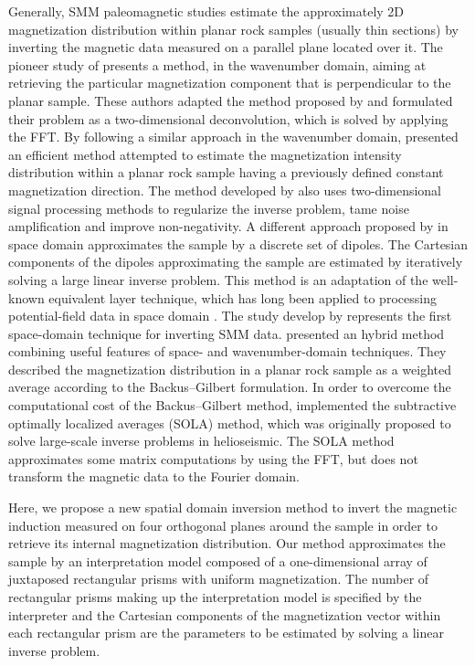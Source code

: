 \documentclass[draft,gc]{agutex}
\begin{document}
\begin{article}
Generally, SMM paleomagnetic studies estimate the approximately 2D magnetization 
distribution within planar rock samples (usually thin sections) 
by inverting the magnetic data measured on a parallel plane
located over it.
The pioneer study of \citet{egli2000} presents a method, in the 
wavenumber domain, aiming at retrieving the particular magnetization 
component that is perpendicular to the planar sample.
These authors adapted the method proposed by \citet{mareschal1985}
and formulated their problem as a two-dimensional 
deconvolution, which is solved by applying the FFT.
By following a similar approach in the wavenumber domain, 
\citet{lima2013} presented an efficient method attempted 
to estimate the magnetization intensity distribution 
within a planar rock sample having a previously defined 
constant magnetization direction.
The method developed by \citet{lima2013} also uses
two-dimensional signal processing methods to regularize the 
inverse problem, tame noise amplification and improve 
non-negativity.
A different approach proposed by \citep{weiss2007} in space domain
approximates the sample by a discrete set of dipoles.
The Cartesian components of the dipoles approximating the sample
are estimated by iteratively solving a large linear inverse problem.
This method is an adaptation of the well-known equivalent
layer technique, which has long been applied to processing
potential-field data in space domain \citep{dampney1969, emilia1973, 
vonfrese-etal1981, hansen-miyazaki1984, silva1986, leao-silva1989, 
cordell1992, mendonca1992, mendonca-silva1994, mendonca-silva1995,
guspi-novara2009, li-oldenburg2010, barnes-lumley2011, 
oliveirajr-etal2013, kara-etal2014, li-nabighian-oldenburg2014,
barnes2014}.
The study develop by \citep{weiss2007} represents the first
space-domain technique for inverting SMM data.
\citet{usui2012} presented an hybrid method combining
useful features of space- and wavenumber-domain techniques.
They described the magnetization distribution in a planar
rock sample as a weighted average according to the 
Backus–Gilbert formulation.
In order to overcome the computational cost of the 
Backus–Gilbert method, \citet{usui2012} implemented 
the subtractive optimally localized averages (SOLA) 
method, which was originally proposed to solve
large-scale inverse problems in helioseismic.
The SOLA method approximates some matrix computations 
by using the FFT, but does not transform the magnetic 
data to the Fourier domain.

Here, we propose a new spatial domain inversion
method to invert the magnetic induction measured on four 
orthogonal planes around the sample in order to retrieve its internal
magnetization distribution. 
Our method approximates the sample by an interpretation model 
composed of a one-dimensional array of juxtaposed rectangular 
prisms with uniform magnetization.
The number of rectangular prisms making 
up the interpretation model is specified by the interpreter and
the Cartesian components of the magnetization vector within 
each rectangular prism are the parameters to be estimated by 
solving a linear inverse problem.


\end{article}
\end{document}
